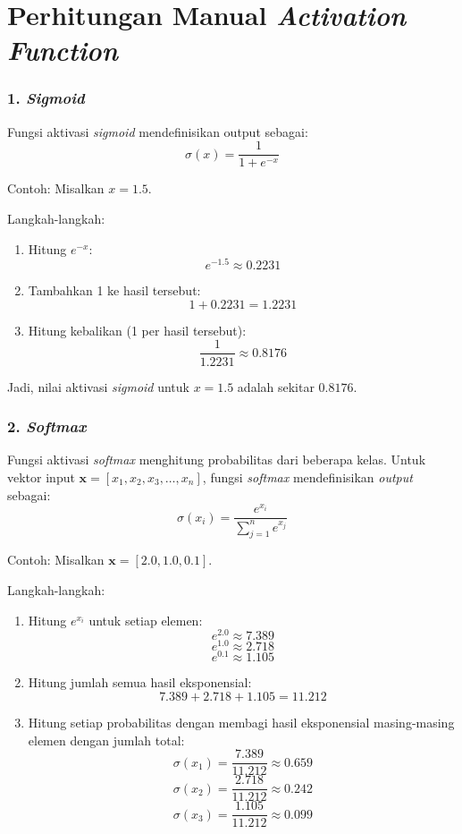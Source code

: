 \chapter{Perhitungan Manual \textit{Activation Function}}
\label{Perhitungan Manual Activation Function}

\subsection*{1. \textit{Sigmoid}}
Fungsi aktivasi \textit{sigmoid} mendefinisikan output sebagai:
\[
\sigma(x) = \frac{1}{1 + e^{-x}}
\]

Contoh: Misalkan \( x = 1.5 \).

Langkah-langkah:
\begin{enumerate}
    \item Hitung \( e^{-x} \):
    \[
    e^{-1.5} \approx 0.2231
    \]

    \item Tambahkan 1 ke hasil tersebut:
    \[
    1 + 0.2231 = 1.2231
    \]

    \item Hitung kebalikan (1 per hasil tersebut):
    \[
    \frac{1}{1.2231} \approx 0.8176
    \]
\end{enumerate}

Jadi, nilai aktivasi \textit{sigmoid} untuk \( x = 1.5 \) adalah sekitar \( 0.8176 \).

\subsection*{2. \textit{Softmax}}
Fungsi aktivasi \textit{softmax} menghitung probabilitas dari beberapa kelas. Untuk vektor input \(\mathbf{x} = [x_1, x_2, x_3, \ldots, x_n]\), fungsi \textit{softmax} mendefinisikan \textit{output} sebagai:
\[
\sigma(x_i) = \frac{e^{x_i}}{\sum_{j=1}^{n} e^{x_j}}
\]

Contoh: Misalkan \(\mathbf{x} = [2.0, 1.0, 0.1]\).

Langkah-langkah:
\begin{enumerate}
    \item Hitung \( e^{x_i} \) untuk setiap elemen:
    \[
    e^{2.0} \approx 7.389
    \]
    \[
    e^{1.0} \approx 2.718
    \]
    \[
    e^{0.1} \approx 1.105
    \]

    \item Hitung jumlah semua hasil eksponensial:
    \[
    7.389 + 2.718 + 1.105 = 11.212
    \]

    \item Hitung setiap probabilitas dengan membagi hasil eksponensial masing-masing elemen dengan jumlah total:
    \[
    \sigma(x_1) = \frac{7.389}{11.212} \approx 0.659
    \]
    \[
    \sigma(x_2) = \frac{2.718}{11.212} \approx 0.242
    \]
    \[
    \sigma(x_3) = \frac{1.105}{11.212} \approx 0.099
    \]
\end{enumerate}

